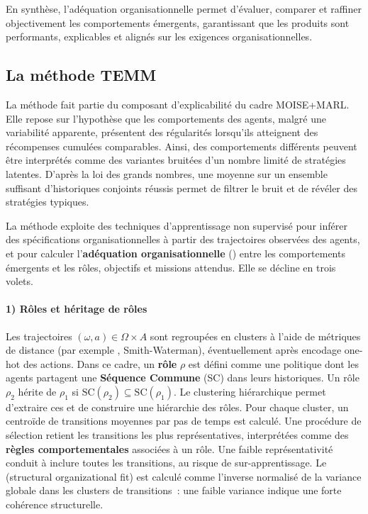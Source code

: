 En synthèse, l’adéquation organisationnelle permet d’évaluer, comparer et raffiner objectivement les comportements émergents, garantissant que les  produits sont performants, explicables et alignés sur les exigences organisationnelles.

\subsection{La méthode TEMM}
\label{sec:TEMM_algorithm}

La méthode  fait partie du composant d'explicabilité du cadre MOISE+MARL. Elle repose sur l’hypothèse que les comportements des agents, malgré une variabilité apparente, présentent des régularités lorsqu'ils atteignent des récompenses cumulées comparables. Ainsi, des comportements différents peuvent être interprétés comme des variantes bruitées d'un nombre limité de stratégies latentes. D’après la loi des grands nombres, une moyenne sur un ensemble suffisant d’historiques conjoints réussis permet de filtrer le bruit et de révéler des stratégies typiques.

La méthode exploite des techniques d’apprentissage non supervisé pour inférer des spécifications organisationnelles à partir des trajectoires observées des agents, et pour calculer l’\textbf{adéquation organisationnelle} () entre les comportements émergents et les rôles, objectifs et missions attendus. Elle se décline en trois volets.

\paragraph{1) Rôles et héritage de rôles}
Les trajectoires $(\omega, a) \in \Omega \times A$ sont regroupées en clusters à l’aide de métriques de distance (par exemple , Smith-Waterman), éventuellement après encodage one-hot des actions.
Dans ce cadre, un \textbf{rôle} $\rho$ est défini comme une politique dont les agents partagent une \textbf{Séquence Commune} (SC) dans leurs historiques.
Un rôle $\rho_2$ hérite de $\rho_1$ si $\text{SC}(\rho_2) \subseteq \text{SC}(\rho_1)$.
Le clustering hiérarchique permet d’extraire ces  et de construire une hiérarchie des rôles.
Pour chaque cluster, un centroïde de transitions moyennes par pas de temps est calculé. Une procédure de sélection retient les transitions les plus représentatives, interprétées comme des \textbf{règles comportementales} associées à un rôle.
Une faible représentativité conduit à inclure toutes les transitions, au risque de sur-apprentissage.
Le \textbf{} (structural organizational fit) est calculé comme l’inverse normalisé de la variance globale dans les clusters de transitions~: une faible variance indique une forte cohérence structurelle.

